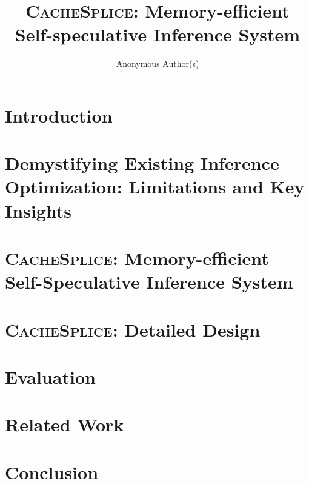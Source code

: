 \documentclass[sigconf]{acmart}
\numberwithin{equation}{section}
\newcommand{\tech}{\textsc{CacheSplice}\xspace}
\begin{document}
\title{\tech: Memory-efficient Self-speculative Inference System}


\author{Anonymous Author(s)}
\renewcommand{\shortauthors}{Anon et al.}

\begin{abstract}

\end{abstract}


\maketitle

\section{Introduction}
\label{sec:intro}


\section{Demystifying Existing Inference Optimization: Limitations and Key Insights}
\label{sec:bg}


\section{\tech: Memory-efficient Self-Speculative Inference System}
\label{sec:method}


\section{\tech: Detailed Design}
\label{sec:detail}


\section{Evaluation}
\label{sec:evaluation}




\section{Related Work}
\label{related}


\section{Conclusion}
\label{sec:conc}


% 



\end{document}
